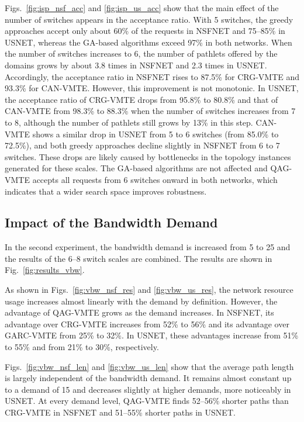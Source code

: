 Figs.~\ref{fig:isp_nsf_acc} and \ref{fig:isp_us_acc} show that the main effect of the number of switches appears in the acceptance ratio. With 5 switches, the greedy approaches accept only about 60\% of the requests in NSFNET and 75--85\% in USNET, whereas the GA-based algorithms exceed 97\% in both networks. When the number of switches increases to 6, the number of pathlets offered by the domains grows by about 3.8 times in NSFNET and 2.3 times in USNET. Accordingly, the acceptance ratio in NSFNET rises to 87.5\% for CRG-VMTE and 93.3\% for CAN-VMTE. However, this improvement is not monotonic. In USNET, the acceptance ratio of CRG-VMTE drops from 95.8\% to 80.8\% and that of CAN-VMTE from 98.3\% to 88.3\% when the number of switches increases from 7 to 8, although the number of pathlets still grows by 13\% in this step. CAN-VMTE shows a similar drop in USNET from 5 to 6 switches (from 85.0\% to 72.5\%), and both greedy approaches decline slightly in NSFNET from 6 to 7 switches. These drops are likely caused by bottlenecks in the topology instances generated for these scales. The GA-based algorithms are not affected and QAG-VMTE accepts all requests from 6 switches onward in both networks, which indicates that a wider search space improves robustness.

\subsection{Impact of the Bandwidth Demand}
\label{subsec:vbw}

In the second experiment, the bandwidth demand is increased from 5 to 25 and the results of the 6--8 switch scales are combined. The results are shown in Fig.~\ref{fig:results_vbw}.

As shown in Figs.~\ref{fig:vbw_nsf_res} and \ref{fig:vbw_us_res}, the network resource usage increases almost linearly with the demand by definition. However, the advantage of QAG-VMTE grows as the demand increases. In NSFNET, its advantage over CRG-VMTE increases from 52\% to 56\% and its advantage over GARC-VMTE from 25\% to 32\%. In USNET, these advantages increase from 51\% to 55\% and from 21\% to 30\%, respectively.

Figs.~\ref{fig:vbw_nsf_len} and \ref{fig:vbw_us_len} show that the average path length is largely independent of the bandwidth demand. It remains almost constant up to a demand of 15 and decreases slightly at higher demands, more noticeably in USNET. At every demand level, QAG-VMTE finds 52--56\% shorter paths than CRG-VMTE in NSFNET and 51--55\% shorter paths in USNET.

